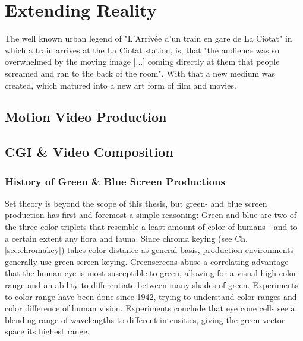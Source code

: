 %
\chapter{Extending Reality}
\label{sec:extendingreality}


The well known urban legend of "L'Arriv\'ee d'un train en gare de La Ciotat" in 
which a train arrives at the La Ciotat station, is, that "the audience was so 
overwhelmed by the moving image [...] coming directly at them that people 
screamed and ran to the back of the room". \cite{wiki:train:2017} With that a 
new medium was created, which matured into a new art form of film and movies.

\section{Motion Video Production}

\section{CGI \& Video Composition}

\subsection{History of Green \& Blue Screen Productions}

Set theory is beyond the scope of this thesis, but green- and blue screen 
production has first and foremost a simple reasoning: Green and blue are two of 
the three color triplets that resemble a least amount of color of humans - and 
to a certain extent any flora and fauna. Since chroma keying (see Ch. 
\ref{sec:chromakey}) takes color distance as general basis, production 
environments generally use green screen keying.
\newline
Greenscreens abuse a correlating advantage that the human eye is most 
susceptible to green, allowing for a visual high color range and an ability to 
differentiate between many shades of green. Experiments to color range have 
been done since 1942, trying to understand color ranges and color difference of 
human vision. Experiments conclude that eye cone cells see a blending range of 
wavelengths to different intensities, giving the green vector space its highest 
range. \cite{MacAdam:1942}

